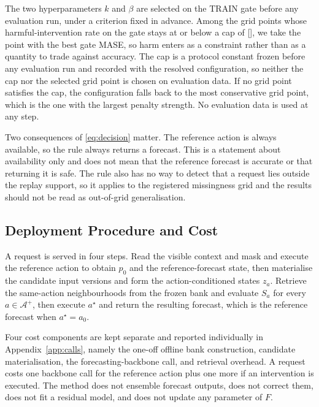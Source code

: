 \documentclass{article}
\newcommand{\ph}[1]{\textcolor{phgray}{\textsf{[\detokenize{#1}]}}}
\newcommand{\calA}{\mathcal{A}}
\begin{document}
The two hyperparameters $k$ and $\beta$ are selected on the TRAIN gate before any evaluation
run, under a criterion fixed in advance. Among the grid points whose harmful-intervention rate
on the gate stays at or below a cap of \ph{GATE_HARM_CAP}, we take the point with the best gate
MASE, so harm enters as a constraint rather than as a quantity to trade against accuracy. The
cap is a protocol constant frozen before any evaluation run and recorded with the resolved
configuration, so neither the cap nor the selected grid point is chosen on evaluation data. If
no grid point satisfies the cap, the configuration falls back to the most conservative grid
point, which is the one with the largest penalty strength. No evaluation data is used at any
step.

Two consequences of \eqref{eq:decision} matter. The reference action is always available, so
the rule always returns a forecast. This is a statement about availability only and does not
mean that the reference forecast is accurate or that returning it is safe. The rule also has
no way to detect that a request lies outside the replay support, so it applies to the
registered missingness grid and the results should not be read as out-of-grid generalisation.

\subsection{Deployment Procedure and Cost}
\label{sec:method-deploy}
A request is served in four steps. Read the visible context and mask and execute the reference
action to obtain $p_0$ and the reference-forecast state, then materialise the candidate input
versions and form the action-conditioned states $z_a$. Retrieve the same-action neighbourhoods
from the frozen bank and evaluate $S_a$ for every $a \in \calA^{+}$, then execute $a^{\star}$
and return the resulting forecast, which is the reference forecast when $a^{\star} = a_0$.

Four cost components are kept separate and reported individually in Appendix~\ref{app:calls},
namely the one-off offline bank construction, candidate materialisation, the
forecasting-backbone call, and retrieval overhead. A request costs one backbone call for the
reference action plus one more if an intervention is executed. The method does not ensemble
forecast outputs, does not correct them, does not fit a residual model, and does not update any
parameter of $F$.

\end{document}
